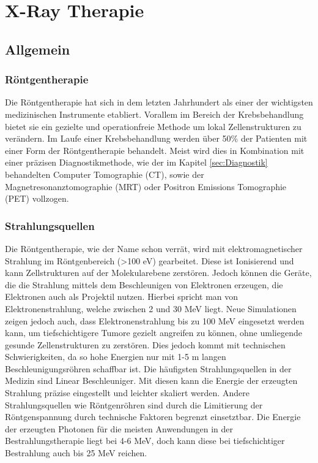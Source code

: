 \newpage
\section{X-Ray Therapie}

\subsection{Allgemein}


\subsubsection{Röntgentherapie}
Die Röntgentherapie hat sich in dem letzten Jahrhundert als einer der wichtigsten medizinischen Instrumente etabliert.
Vorallem im Bereich der Krebsbehandlung bietet sie ein gezielte und operationfreie Methode um lokal Zellenstrukturen zu verändern.
Im Laufe einer Krebsbehandlung werden über 50\% der Patienten mit einer Form der Röntgentherapie behandelt.
Meist wird dies in Kombination mit einer präzisen Diagnostikmethode, wie der im Kapitel \ref{sec:Diagnostik} behandelten Computer Tomographie (CT), sowie
der Magnetresonanztomographie (MRT) oder Positron Emissions Tomographie (PET) vollzogen. \cite{hoskin2019external}
\subsubsection{Strahlungsquellen}
Die Röntgentherapie, wie der Name schon verrät, wird mit elektromagnetischer Strahlung im Röntgenbereich (>100 eV) gearbeitet. 
Diese ist Ionisierend und kann Zellstrukturen auf der Molekularebene zerstören.
Jedoch können die Geräte, die die Strahlung mittels dem Beschleunigen von Elektronen erzeugen, die Elektronen auch als Projektil nutzen.
Hierbei spricht man von Elektronenstrahlung, welche zwischen 2 und 30 MeV liegt.
Neue Simulationen zeigen jedoch auch, dass Elektronenstrahlung bis zu 100 MeV eingesetzt werden kann, um tiefschichtigere Tumore gezielt angreifen zu können, ohne umliegende gesunde Zellenstrukturen zu zerstören.
Dies jedoch kommt mit technischen Schwierigkeiten, da so hohe Energien nur mit 1-5 m langen Beschleunigungsröhren schaffbar ist. \cite{shady_author}
Die häufigsten Strahlungsquellen in der Medizin sind Linear Beschleuniger.
Mit diesen kann die Energie der erzeugten Strahlung präzise eingestellt und leichter skaliert werden.
Andere Strahlungsquellen wie Röntgenröhren sind durch die Limitierung der Röntgenspannung durch technische Faktoren begrenzt einsetztbar.
Die Energie der erzeugten Photonen für die meisten Anwendungen in der Bestrahlungstherapie liegt bei 4-6 MeV, doch kann diese bei tiefschichtiger Bestrahlung auch bis 25 MeV reichen. \cite{KriegerHannoSfTu}









